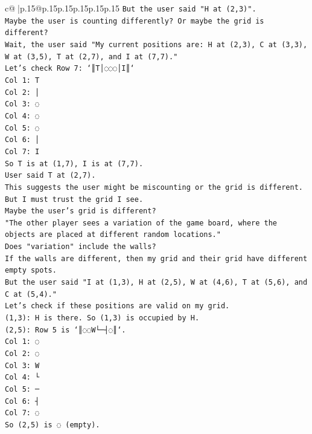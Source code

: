 \documentclass{article}
\begin{document}
{\begin{supertabular}{c@{$\;$}|p{.15\linewidth}@{}p{.15\linewidth}p{.15\linewidth}p{.15\linewidth}p{.15\linewidth}p{.15\linewidth}}
{{{\texttt{But the user said "H at (2,3)".} \\
\texttt{Maybe the user is counting differently? Or maybe the grid is different?} \\
\texttt{Wait, the user said "My current positions are: H at (2,3), C at (3,3), W at (3,5), T at (2,7), and I at (7,7)."} \\
\texttt{Let's check Row 7: `║T│◌◌◌│I║`} \\
\texttt{Col 1: T} \\
\texttt{Col 2: │} \\
\texttt{Col 3: ◌} \\
\texttt{Col 4: ◌} \\
\texttt{Col 5: ◌} \\
\texttt{Col 6: │} \\
\texttt{Col 7: I} \\
\texttt{So T is at (1,7), I is at (7,7).} \\
\texttt{User said T at (2,7).} \\
\texttt{This suggests the user might be miscounting or the grid is different.} \\
\texttt{But I must trust the grid I see.} \\
\texttt{Maybe the user's grid is different?} \\
\texttt{"The other player sees a variation of the game board, where the objects are placed at different random locations."} \\
\texttt{Does "variation" include the walls?} \\
\texttt{If the walls are different, then my grid and their grid have different empty spots.} \\
\texttt{But the user said "I at (1,3), H at (2,5), W at (4,6), T at (5,6), and C at (5,4)."} \\
\texttt{Let's check if these positions are valid on my grid.} \\
\texttt{(1,3): H is there. So (1,3) is occupied by H.} \\
\texttt{(2,5): Row 5 is `║◌◌W└─┤◌║`.} \\
\texttt{Col 1: ◌} \\
\texttt{Col 2: ◌} \\
\texttt{Col 3: W} \\
\texttt{Col 4: └} \\
\texttt{Col 5: ─} \\
\texttt{Col 6: ┤} \\
\texttt{Col 7: ◌} \\
\texttt{So (2,5) is ◌ (empty).} \\
}}}
\end{supertabular}}
\end{document}
